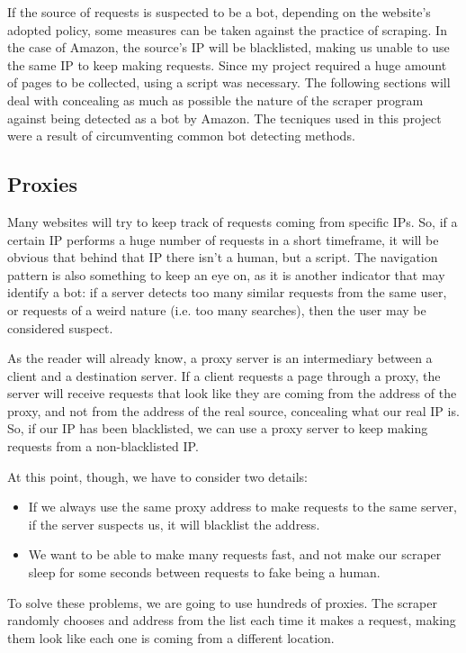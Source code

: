 \documentclass[LaM,binding=0.6cm]{sapthesis}
\begin{document}
If the source of requests is suspected to be a bot, depending on the website's adopted policy, some measures can be taken against the practice of scraping. In the case of Amazon, the source's IP will be blacklisted, making us unable to use the same IP to keep making requests. 
Since my project required a huge amount of pages to be collected, using a script was necessary. The following sections will deal with concealing as much as possible the nature of the scraper program against being detected as a bot by Amazon.
The tecniques used in this project were a result of circumventing common bot detecting methods.  
 
\subsection{Proxies}

Many websites will try to keep track of requests coming from specific IPs. So, if a certain IP performs a huge number of requests in a short timeframe, it will be obvious that behind that IP there isn't a human, but a script. The navigation pattern is also something to keep an eye on, as it is another indicator that may identify a bot: if a server detects too many similar requests from the same user, or requests of a weird nature (i.e. too many searches), then the user may be considered suspect.

As the reader will already know, a proxy server is an intermediary between a client and a destination server. If a client requests a page through a proxy, the server will receive requests that look like they are coming from the address of the proxy, and not from the address of the real source, concealing what our real IP is. So, if our IP has been blacklisted, we can use a proxy server to keep making requests from a non-blacklisted IP. 

At this point, though, we have to consider two details:
\begin{itemize}
	\item If we always use the same proxy address to make requests to the same server, if the server suspects us, it will blacklist the address.
	\item We want to be able to make many requests fast, and not make our scraper sleep for some seconds between requests to fake being a human. 
\end{itemize}

To solve these problems, we are going to use hundreds of proxies. The scraper randomly chooses and address from the list each time it makes a request, making them look like each one is coming from a different location.
\end{document}
